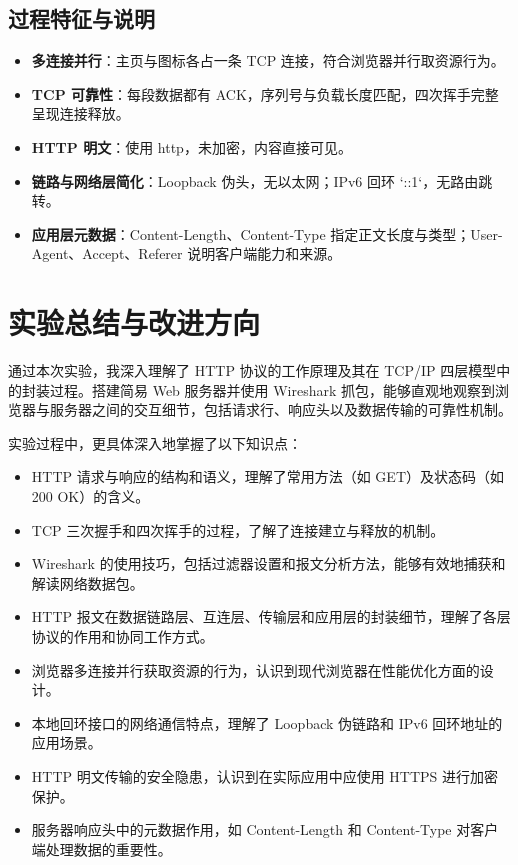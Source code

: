 \documentclass[a4paper]{article}
\begin{document}
	\subsection{过程特征与说明}
	\begin{itemize}
		\item \textbf{多连接并行}：主页与图标各占一条 TCP 连接，符合浏览器并行取资源行为。
		\item \textbf{TCP 可靠性}：每段数据都有 ACK，序列号与负载长度匹配，四次挥手完整呈现连接释放。
		\item \textbf{HTTP 明文}：使用 http，未加密，内容直接可见。
		\item \textbf{链路与网络层简化}：Loopback 伪头，无以太网；IPv6 回环 `::1`，无路由跳转。
		\item \textbf{应用层元数据}：Content-Length、Content-Type 指定正文长度与类型；User-Agent、Accept、Referer 说明客户端能力和来源。
	\end{itemize}
	
	\section{实验总结与改进方向}
	通过本次实验，我深入理解了 HTTP 协议的工作原理及其在 TCP/IP 四层模型中的封装过程。搭建简易 Web 服务器并使用 Wireshark 抓包，能够直观地观察到浏览器与服务器之间的交互细节，包括请求行、响应头以及数据传输的可靠性机制。

	实验过程中，更具体深入地掌握了以下知识点：
	\begin{itemize}
		\item HTTP 请求与响应的结构和语义，理解了常用方法（如 GET）及状态码（如 200 OK）的含义。
		\item TCP 三次握手和四次挥手的过程，了解了连接建立与释放的机制。
		\item Wireshark 的使用技巧，包括过滤器设置和报文分析方法，能够有效地捕获和解读网络数据包。
		\item HTTP 报文在数据链路层、互连层、传输层和应用层的封装细节，理解了各层协议的作用和协同工作方式。
		\item 浏览器多连接并行获取资源的行为，认识到现代浏览器在性能优化方面的设计。
		\item 本地回环接口的网络通信特点，理解了 Loopback 伪链路和 IPv6 回环地址的应用场景。
		\item HTTP 明文传输的安全隐患，认识到在实际应用中应使用 HTTPS 进行加密保护。
		\item 服务器响应头中的元数据作用，如 Content-Length 和 Content-Type 对客户端处理数据的重要性。
	\end{itemize}
	
\end{document}
